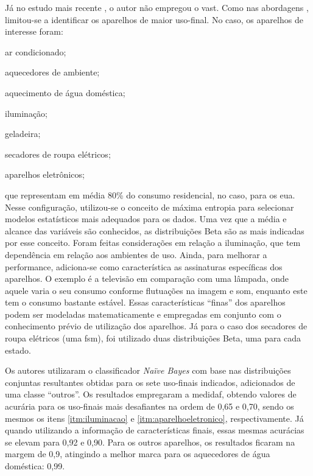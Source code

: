 \begin{enumerate}[label=\textbf{1.\arabic*},wide=\parindent]
Já no estudo mais recente
\cite{nilm_zeifman_statistical_naive_enduses_2013}, o autor não
empregou o \gls{vast}. Como nas abordagens \cite{nilm_farinaccio_16ssamp_1999_17,
nilm_marceau_16ssamp_improved_1999_18}, limitou-se a identificar os
aparelhos de maior uso-final. No caso, os aparelhos de interesse foram:
\begin{enumerate*}[label=\itshape\alph*\upshape)]
\item ar condicionado;
\item aquecedores de ambiente;
\item aquecimento de água doméstica;
\item \label{itm:iluminacao} iluminação;
\item geladeira;
\item secadores de roupa elétricos;
\item \label{itm:aparelhoeletronico} aparelhos eletrônicos;
\end{enumerate*} que representam em média 80\% do consumo residencial,
no caso, para os \gls{eua}. Nesse configuração, utilizou-se o conceito
de máxima entropia para selecionar modelos estatísticos mais adequados
para os dados. Uma vez que a média e alcance das variáveis são conhecidos,
as distribuições Beta são as mais indicadas por esse conceito. Foram
feitas considerações em relação a iluminação, que tem dependência em
relação aos ambientes de uso. Ainda, para melhorar a performance,
adiciona-se como característica as assinaturas específicas dos
aparelhos. O exemplo é a televisão em comparação com uma lâmpada, onde
aquele varia o seu consumo conforme flutuações na imagem e som,
enquanto este tem o consumo bastante estável. Essas
características ``finas'' dos aparelhos podem ser modeladas
matematicamente e empregadas em conjunto com o conhecimento prévio de
utilização dos aparelhos. Já para o caso dos secadores de roupa
elétricos (uma \gls{fsm}), foi utilizado duas distribuições Beta, uma
para cada estado.

Os autores utilizaram o classificador \emph{Naïve Bayes} com base nas
distribuições conjuntas resultantes obtidas para os sete uso-finais
indicados, adicionados de uma classe ``outros''.  Os resultados
empregaram a \acs{medidaf}, obtendo valores de acurária para os
uso-finais mais desafiantes na ordem de 0,65 e 0,70, sendo os mesmos
os itens \ref{itm:iluminacao} e \ref{itm:aparelhoeletronico},
respectivamente. Já quando utilizando a informação de características
finais, essas mesmas acurácias se elevam para 0,92 e 0,90. Para os
outros aparelhos, os resultados ficaram na margem de 0,9, atingindo a
melhor marca para os aquecedores de água doméstica: 0,99.

\end{enumerate}

